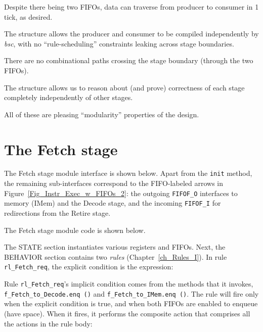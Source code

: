 \begin{tightlist}

 \item Despite there being two FIFOs, data can traverse from producer
       to consumer in 1 tick, as desired.

 \item The structure allows the producer and consumer to be compiled
       independently by \emph{bsc}, with no ``rule-scheduling''
       constraints leaking across stage boundaries.

 \item There are no combinational paths crossing the stage boundary
       (through the two FIFOs).

 \item The structure allows us to reason about (and prove) correctness
       of each stage completely independently of other stages.

\end{tightlist}
All of these are pleasing ``modularity'' properties of the design.


\section{The Fetch stage}

\label{Sec_Fife_Fetch_stage}

The Fetch stage module interface is shown below.  Apart from the
\verb|init| method, the remaining sub-interfaces correspond to the
FIFO-labeled arrows in Figure~\ref{Fig_Instr_Exec_w_FIFOs_2}: the
outgoing \verb|FIFOF_O| interfaces to memory (IMem) and the Decode
stage, and the incoming \verb|FIFOF_I| for redirections from the
Retire stage.


The Fetch stage module code is shown below.


The STATE section instantiates various registers and FIFOs.  Next, the
BEHAVIOR section contains two \emph{rules} (Chapter~\ref{ch_Rules_I}).
In rule \verb|rl_Fetch_req|, the explicit condition is the expression:


Rule \verb|rl_Fetch_req|'s implicit condition comes from the methods
that it invokes, \verb|f_Fetch_to_Decode.enq ()| and
\verb|f_Fetch_to_IMem.enq ()|.  The rule will fire only when the
explicit condition is true, and when both FIFOs are enabled to enqueue
(have space).  When it fires, it performs the composite action that
comprises all the actions in the rule body:


